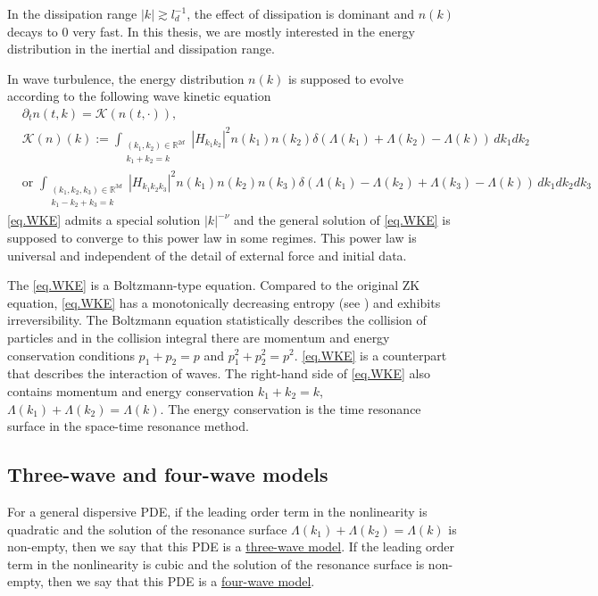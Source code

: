 In the dissipation range $|k|\gtrsim l_d^{-1}$, the effect of dissipation is dominant and $n(k)$ decays to $0$ very fast. In this thesis, we are mostly interested in the energy distribution in the inertial and dissipation range.


In wave turbulence, the energy distribution $n(k)$ is supposed to evolve according to the following wave kinetic equation
\[
\tag{WKE}\label{eq.WKE}
\begin{split}
&\partial_t n(t, k) =\mathcal K\left(n(t, \cdot)\right),
\\
&\mathcal K(n)(k):= \int_{\substack{(k_1, k_2)\in \mathbb{R}^{2d}\\k_1+k_2=k}}\left|H_{k_1k_2}\right|^2n(k_1) n(k_2)\delta(\Lambda(k_1)+\Lambda(k_2)-\Lambda(k))\, dk_1 dk_2
\\
&\text{or }\int_{\substack{(k_1, k_2, k_3)\in \mathbb{R}^{3d}\\k_1-k_2+k_3=k}}\left|H_{k_1k_2k_3}\right|^2n(k_1) n(k_2)n(k_3)\delta(\Lambda(k_1)-\Lambda(k_2)+\Lambda(k_3)-\Lambda(k))\, dk_1 dk_2dk_3
\end{split}
\]
\eqref{eq.WKE} admits a special solution $|k|^{-\nu}$ and the general solution of \eqref{eq.WKE} is supposed to converge to this power law in some regimes. This power law is universal and independent of the detail of external force and initial data.

The \eqref{eq.WKE} is a Boltzmann-type equation. Compared to the original ZK equation, \eqref{eq.WKE} has a monotonically decreasing entropy (see \cite{germain2020optimal}) and exhibits irreversibility. The Boltzmann equation statistically describes the collision of particles and in the collision integral there are momentum and energy conservation conditions $p_1+p_2=p$ and $p^2_1+p^2_2=p^2$. \eqref{eq.WKE} is a counterpart that describes the interaction of waves. The right-hand side of \eqref{eq.WKE} also contains momentum and energy conservation $k_1+k_2=k$,  $\Lambda(k_1)+\Lambda(k_2)=\Lambda(k)$. The energy conservation is the time resonance surface in the space-time resonance method.


\subsection{Three-wave and four-wave models}

For a general dispersive PDE, if the leading order term in the nonlinearity is quadratic and the solution of the resonance surface $\Lambda(k_1)+\Lambda(k_2)=\Lambda(k)$ is non-empty, then we say that this PDE is a \underline{three-wave model}. If the leading order term in the nonlinearity is cubic and the solution of the resonance surface is non-empty, then we say that this PDE is a \underline{four-wave model}. 


